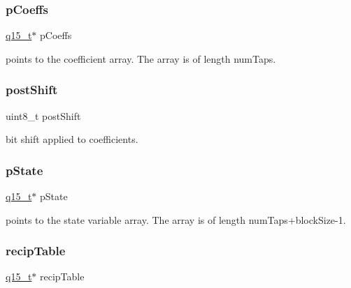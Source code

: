 \subsubsection{\texorpdfstring{pCoeffs}{pCoeffs}}
{\footnotesize\ttfamily \mbox{\hyperlink{arm__math_8h_ab5a8fb21a5b3b983d5f54f31614052ea}{q15\+\_\+t}}$\ast$ p\+Coeffs}

points to the coefficient array. The array is of length num\+Taps. \mbox{\label{structarm__lms__norm__instance__q15_a74050e9f36542bd56f4052381a82ae8f}} 
\subsubsection{\texorpdfstring{postShift}{postShift}}
{\footnotesize\ttfamily uint8\+\_\+t post\+Shift}

bit shift applied to coefficients. \mbox{\label{structarm__lms__norm__instance__q15_ae29dfdb736374fcddaeaec4b7770170c}} 
\subsubsection{\texorpdfstring{pState}{pState}}
{\footnotesize\ttfamily \mbox{\hyperlink{arm__math_8h_ab5a8fb21a5b3b983d5f54f31614052ea}{q15\+\_\+t}}$\ast$ p\+State}

points to the state variable array. The array is of length num\+Taps+block\+Size-\/1. \mbox{\label{structarm__lms__norm__instance__q15_a39b65b32f68643831304cece01e093bd}} 
\subsubsection{\texorpdfstring{recipTable}{recipTable}}
{\footnotesize\ttfamily \mbox{\hyperlink{arm__math_8h_ab5a8fb21a5b3b983d5f54f31614052ea}{q15\+\_\+t}}$\ast$ recip\+Table}

